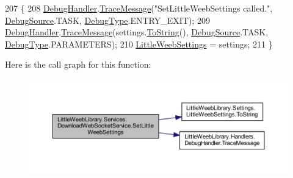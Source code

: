 \begin{DoxyCode}
207         \{
208             \mbox{\hyperlink{class_little_weeb_library_1_1_handlers_1_1_debug_handler}{DebugHandler}}.\mbox{\hyperlink{class_little_weeb_library_1_1_handlers_1_1_debug_handler_afccb37dfd6b2114af72000c2f4fe4607}{TraceMessage}}(\textcolor{stringliteral}{"SetLittleWeebSettings called."}, 
      \mbox{\hyperlink{namespace_little_weeb_library_1_1_handlers_a2a6ca0775121c9c503d58aa254d292be}{DebugSource}}.TASK, \mbox{\hyperlink{namespace_little_weeb_library_1_1_handlers_ab66019ed40462876ec4e61bb3ccb0a62}{DebugType}}.ENTRY\_EXIT);
209             \mbox{\hyperlink{class_little_weeb_library_1_1_handlers_1_1_debug_handler}{DebugHandler}}.\mbox{\hyperlink{class_little_weeb_library_1_1_handlers_1_1_debug_handler_afccb37dfd6b2114af72000c2f4fe4607}{TraceMessage}}(settings.\mbox{\hyperlink{class_little_weeb_library_1_1_settings_1_1_little_weeb_settings_a5a5b722dd8e117be810022882795b6ae}{ToString}}(), 
      \mbox{\hyperlink{namespace_little_weeb_library_1_1_handlers_a2a6ca0775121c9c503d58aa254d292be}{DebugSource}}.TASK, \mbox{\hyperlink{namespace_little_weeb_library_1_1_handlers_ab66019ed40462876ec4e61bb3ccb0a62}{DebugType}}.PARAMETERS);
210             \mbox{\hyperlink{class_little_weeb_library_1_1_settings_1_1_little_weeb_settings}{LittleWeebSettings}} = settings;
211         \}
\end{DoxyCode}
Here is the call graph for this function\+:\nopagebreak
\begin{figure}[H]
\begin{center}
\leavevmode
\includegraphics[width=350pt]{class_little_weeb_library_1_1_services_1_1_download_web_socket_service_a4b1d1eda437419a534bb4ee17ed26d4f_cgraph}
\end{center}
\end{figure}
\mbox{\label{class_little_weeb_library_1_1_services_1_1_download_web_socket_service_a0ab2f2e6fcb90cd42dfa0de9d6a58f7e}} 
